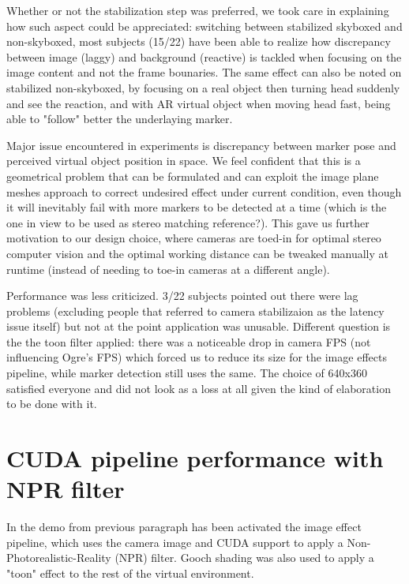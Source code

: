 Whether or not the stabilization step was preferred, we took care in explaining how such aspect could be appreciated: switching between stabilized skyboxed and non-skyboxed, most subjects (15/22) have been able to realize how discrepancy between image (laggy) and background (reactive) is tackled when focusing on the image content and not the frame bounaries. The same effect can also be noted on stabilized non-skyboxed, by focusing on a real object then turning head suddenly and see the reaction, and with AR virtual object when moving head fast, being able to "follow" better the underlaying marker.

Major issue encountered in experiments is discrepancy between marker pose and perceived virtual object position in space. We feel confident that this is a geometrical problem that can be formulated and can exploit the image plane meshes approach to correct undesired effect under current condition, even though it will inevitably fail with more markers to be detected at a time (which is the one in view to be used as stereo matching reference?). This gave us further motivation to our design choice, where cameras are toed-in for optimal stereo computer vision and the optimal working distance can be tweaked manually at runtime (instead of needing to toe-in cameras at a different angle).

Performance was less criticized. 3/22 subjects pointed out there were lag problems (excluding people that referred to camera stabilizaion as the latency issue itself) but not at the point application was unusable. Different question is the the toon filter applied: there was a noticeable drop in camera FPS (not influencing Ogre's FPS) which forced us to reduce its size for the image effects pipeline, while marker detection still uses the same. The choice of 640x360 satisfied everyone and did not look as a loss at all given the kind of elaboration to be done with it.

\section{CUDA pipeline performance with NPR filter}
In the demo from previous paragraph has been activated the image effect pipeline, which uses the camera image and CUDA support to apply a Non-Photorealistic-Reality (NPR) filter. Gooch shading was also used to apply a "toon" effect to the rest of the virtual environment.

